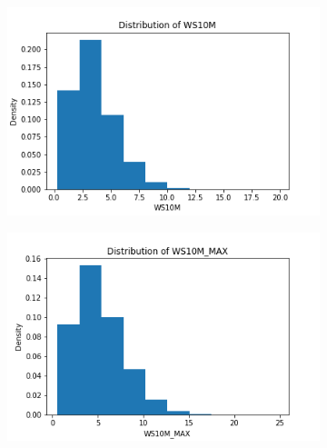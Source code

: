 \documentclass{article}
\begin{document}
\begin{itemize}
\begin{figure}[htbp]
\begin{subfigure}{0.3\textwidth}
            \end{subfigure}
            \begin{subfigure}{0.3\textwidth}
                \centering
                \includegraphics[width=\linewidth]{pic/hist/Distribution WS10M .png}
            \end{subfigure}
            \begin{subfigure}{0.3\textwidth}
                \centering
                \includegraphics[width=\linewidth]{pic/hist/Distribution WS10M_MAX .png}
            \end{subfigure}
            \begin{subfigure}{0.3\textwidth}
                \centering

\end{subfigure}
\end{figure}
\end{itemize}
\end{document}
